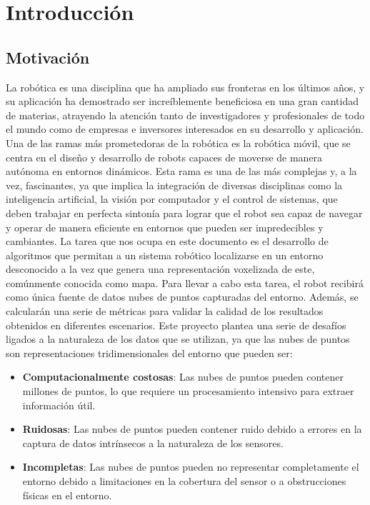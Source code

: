\documentclass[12pt, a4paper, twoside]{article}
\begin{document}
\tableofcontents

\section{Introducción}

\subsection{Motivación}
La robótica es una disciplina que ha ampliado sus fronteras en los últimos años, y su aplicación ha demostrado ser 
increíblemente beneficiosa en una gran cantidad de materias, atrayendo la atención tanto de investigadores y profesionales de todo el 
mundo como de empresas e inversores interesados en su desarrollo y aplicación. \newline
Una de las ramas más prometedoras de la robótica es la robótica móvil, que se centra en el diseño y desarrollo de robots capaces 
de moverse de manera autónoma en entornos dinámicos. Esta rama es una de las más complejas y, a la vez, fascinantes, ya que implica 
la integración de diversas disciplinas como la inteligencia artificial, la visión por computador y el control de sistemas, que 
deben trabajar en perfecta sintonía para lograr que el robot sea capaz de navegar y operar de manera eficiente en entornos que 
pueden ser impredecibles y cambiantes. \newline
La tarea que nos ocupa en este documento es el desarrollo de algoritmos que permitan a un sistema robótico localizarse en un entorno 
desconocido a la vez que genera una representación voxelizada de este, comúnmente conocida como mapa. Para llevar a cabo esta tarea, 
el robot recibirá como única fuente de datos nubes de puntos capturadas del entorno. Además, se calcularán una serie de métricas para 
validar la calidad de los resultados obtenidos en diferentes escenarios.\newline
Este proyecto plantea una serie de desafíos ligados a la naturaleza de los datos que se utilizan, ya que las nubes de puntos son 
representaciones tridimensionales del entorno que pueden ser:  
\begin{itemize}
  \item  \textbf{Computacionalmente costosas}: 
    Las nubes de puntos pueden contener millones de puntos, lo que requiere un procesamiento intensivo para extraer información útil.
  \item  \textbf{Ruidosas}:
    Las nubes de puntos pueden contener ruido debido a errores en la captura de datos intrínsecos a la naturaleza de los sensores.
  \item  \textbf{Incompletas}:
    Las nubes de puntos pueden no representar completamente el entorno debido a limitaciones en la cobertura del sensor o a 
    obstrucciones físicas en el entorno.
\end{itemize}
\end{document}
